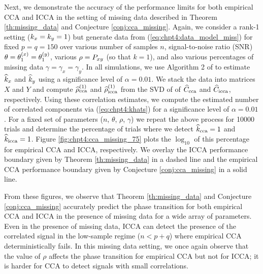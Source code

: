 Next, we demonstrate the accuracy of the performance limits for both empirical CCA and
ICCA in the setting of missing data described in Theorem \ref{th:missing_data} and
Conjecture \ref{conj:cca_missing}. Again, we consider a rank-1 setting ($k_x=k_y=1$) but
generate data from (\ref{eq:chpt4:data_model_miss}) for fixed $p=q=150$ over various
number of samples $n$, signal-to-noise ratio (SNR) $\theta=\theta^{(x)}_1=\theta^{(y)}_1$, various
$\rho=P_{xy}$ (so that $k=1$), and also various percentages of missing data
$\gamma=\gamma_x=\gamma_y$. In all simulations, we use Algorithm 2 of
\cite{nadakuditi2010fundamental} to estimate $\widehat{k}_x$ and $\widehat{k}_y$ using a significance
level of $\alpha=0.01$. We stack the data into matrices $X$ and $Y$ and compute
$\widehat{\rho}_\text{cca}^{(1)}$ and $\widehat{\rho}_\text{icca}^{(1)}$ from the SVD of of $\widehat{C}_{\text{cca}}$ and $\widehat{C}_{\text{icca}}$,
respectively. Using these correlation estimates, we compute the estimated number of
correlated components via (\ref{eq:chpt4:khats}) for a significance level of
$\alpha=0.01$. For a fixed set of parameters ($n$, $\theta$, $\rho$, $\gamma$) we repeat
the above process for 10000 trials and determine the percentage of trials where we detect
$\widehat{k}_{\text{cca}}=1$ and $\widehat{k}_{\text{icca}}=1$. Figure \ref{fig:chpt4:cca_missing_75} plots the
$\log_{10}$ of this percentage for empirical CCA and ICCA, respectively. We
overlay the ICCA performance boundary given by Theorem \ref{th:missing_data} in a dashed line
and the empirical CCA performance boundary given by Conjecture \ref{conj:cca_missing} in a
solid line.

From these figures, we observe that Theorem \ref{th:missing_data} and Conjecture
\ref{conj:cca_missing} accurately predict the phase transition for both empirical CCA and
ICCA in the presence of missing data for a wide array of parameters. Even in the presence
of missing data, ICCA can detect the presence of the correlated signal in the low-sample
regime ($n<p+q$) where empirical CCA deterministically fails.  In this missing data
setting, we once again observe that the value of $\rho$ affects the phase transition for
empirical CCA but not for ICCA; it is harder for CCA to detect signals with small
correlations.

